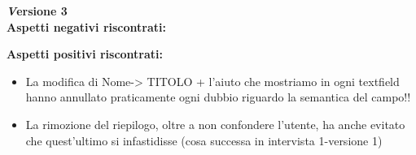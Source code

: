 \textbf{\emph Versione 3}\\
\textbf{Aspetti negativi riscontrati:}
\newline\newline

\textbf{Aspetti positivi riscontrati:}
\begin{itemize}[label=-]

\item La modifica di Nome-> TITOLO + l’aiuto che mostriamo in ogni textfield hanno
annullato praticamente ogni dubbio riguardo la semantica del campo!!
\item La rimozione del riepilogo, oltre a non confondere l’utente, ha anche evitato
che quest’ultimo si infastidisse (cosa successa in intervista 1-versione 1)

\end{itemize}

